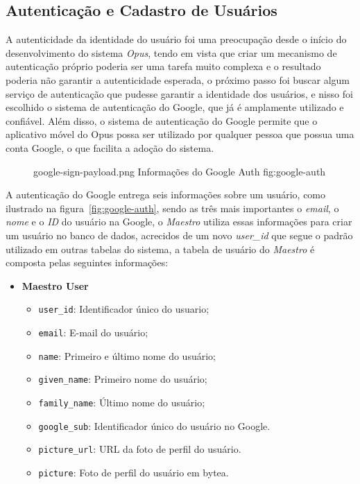 \subsection{Autenticação e Cadastro de Usuários}
\label{sec:maestro-auth}

A autenticidade da identidade do usuário foi uma preocupação desde o início do desenvolvimento do sistema \emph{Opus}, tendo em vista que criar um mecanismo
de autenticação próprio poderia ser uma tarefa muito complexa e o resultado poderia não garantir a autenticidade esperada, o próximo passo foi buscar
algum serviço de autenticação que pudesse garantir a identidade dos usuários, e nisso foi escolhido o sistema de autenticação do Google, que já é amplamente
utilizado e confiável. Além disso, o sistema de autenticação do Google permite que o aplicativo móvel do Opus possa ser utilizado por qualquer pessoa que
possua uma conta Google, o que facilita a adoção do sistema.

\begin{figure}[h!]
    {google-sign-payload.png}
    {Informações do Google Auth}
    {fig:google-auth}
\end{figure}

A autenticação do Google entrega seis informações sobre um usuário, como ilustrado na figura~\ref{fig:google-auth},
sendo as três mais importantes o \emph{email}, o \emph{nome} e o \emph{ID} do usuário na Google, o \emph{Maestro} utiliza essas informações para
criar um usuário no banco de dados, acrecidos de um novo \emph{user\_id} que segue o padrão utilizado em outras tabelas do sistema,
a tabela de usuário do \emph{Maestro} é composta pelas seguintes informações:

\begin{itemize}
    \item \textbf{Maestro User}  
      \begin{itemize}
          \item \texttt{user\_id}: Identificador único do usuario;
          \item \texttt{email}: E-mail do usuário;
          \item \texttt{name}: Primeiro e último nome do usuário;
          \item \texttt{given\_name}: Primeiro nome do usuário;
          \item \texttt{family\_name}: Último nome do usuário;
          \item \texttt{google\_sub}: Identificador único do usuário no Google.
          \item \texttt{picture\_url}: URL da foto de perfil do usuário.
          \item \texttt{picture}: Foto de perfil do usuário em bytea.
      \end{itemize}
\end{itemize}

